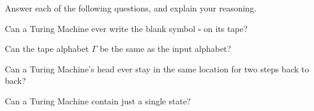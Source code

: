 \documentclass[12pt]{article}
\newenvironment{exercise}[2][Exercise]{\begin{trivlist}
\item[\hskip \labelsep {\bfseries #1}\hskip \labelsep {\bfseries #2.}]}{\end{trivlist}}
\newenvironment{solution}[1][{\color{red} Solution:}]{\begin{trivlist}
\item[\hskip \labelsep {\bfseries #1}\hskip \labelsep {\bfseries}]}{\end{trivlist}}
\begin{document}

\newcommand{\studentName}{YOUR NAME HERE} %

\newcommand{\collaborators}{
	with \textit{COLLABORATORS' NAMES HERE}
}

\begin{exercise}{1}

Answer each of the following questions, and explain your reasoning.
\begin{enumerate}[(a)]
	\item Can a Turing Machine ever write the blank symbol $\square$ on its tape?
	\begin{solution}
	\end{solution}

	\item Can the tape alphabet $\Gamma$ be the same as the input alphabet?
	\begin{solution}
	\end{solution}

	\item Can a Turing Machine's head ever stay in the same location for two steps back to back?
	\begin{solution}
	\end{solution}

	\item Can a Turing Machine contain just a single state?
	\begin{solution}
	\end{solution}
\end{enumerate}
\end{exercise}

\clearpage
\end{document}
